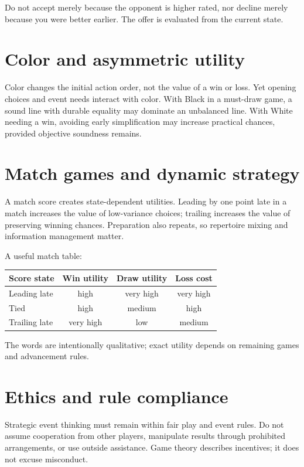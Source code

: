 Do not accept merely because the opponent is higher rated, nor decline merely because you were better earlier. The offer is evaluated from the current state.

\section{Color and asymmetric utility}
Color changes the initial action order, not the value of a win or loss. Yet opening choices and event needs interact with color. With Black in a must-draw game, a sound line with durable equality may dominate an unbalanced line. With White needing a win, avoiding early simplification may increase practical chances, provided objective soundness remains.

\section{Match games and dynamic strategy}
A match score creates state-dependent utilities. Leading by one point late in a match increases the value of low-variance choices; trailing increases the value of preserving winning chances. Preparation also repeats, so repertoire mixing and information management matter.

A useful match table:

\begin{center}
\begin{tabular}{lccc}
\toprule
Score state & Win utility & Draw utility & Loss cost\\
\midrule
Leading late & high & very high & very high\\
Tied & high & medium & high\\
Trailing late & very high & low & medium\\
\bottomrule
\end{tabular}
\end{center}

The words are intentionally qualitative; exact utility depends on remaining games and advancement rules.

\section{Ethics and rule compliance}
Strategic event thinking must remain within fair play and event rules. Do not assume cooperation from other players, manipulate results through prohibited arrangements, or use outside assistance. Game theory describes incentives; it does not excuse misconduct.

